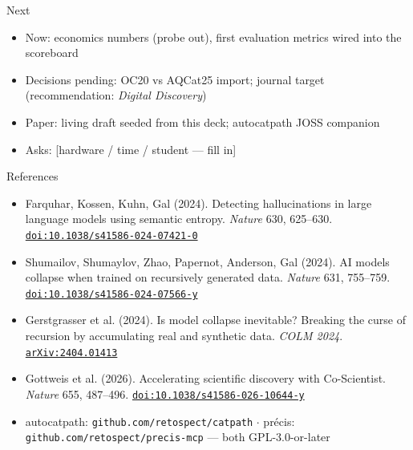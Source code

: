 \documentclass[aspectratio=169,10pt]{beamer}
\newcommand{\doi}[1]{\href{https://doi.org/#1}{\texttt{doi:#1}}}
\gdef\SlideCite{}
\newcommand{\citefield}[1]{\gdef\SlideCite{#1}}
\begin{document}
\begin{frame}{Next}
  \citefield{}
  \begin{itemize}
    \item Now: economics numbers (probe out), first evaluation metrics
          wired into the scoreboard
    \item Decisions pending: OC20 vs AQCat25 import; journal target
          (recommendation: \emph{Digital Discovery})
    \item Paper: living draft seeded from this deck; autocatpath JOSS
          companion
    \item Asks: [hardware / time / student --- fill in]
  \end{itemize}
\end{frame}

\begin{frame}{References}
  \citefield{}
  \scriptsize
  \begin{itemize}
    \item Farquhar, Kossen, Kuhn, Gal (2024). Detecting hallucinations in
          large language models using semantic entropy. \emph{Nature} 630,
          625--630. \doi{10.1038/s41586-024-07421-0}
    \item Shumailov, Shumaylov, Zhao, Papernot, Anderson, Gal (2024).
          AI models collapse when trained on recursively generated data.
          \emph{Nature} 631, 755--759. \doi{10.1038/s41586-024-07566-y}
    \item Gerstgrasser et al. (2024). Is model collapse inevitable?
          Breaking the curse of recursion by accumulating real and
          synthetic data. \emph{COLM 2024}.
          \href{https://arxiv.org/abs/2404.01413}{\texttt{arXiv:2404.01413}}
    \item Gottweis et al. (2026). Accelerating scientific discovery with
          Co-Scientist. \emph{Nature} 655, 487--496.
          \doi{10.1038/s41586-026-10644-y}
    \item autocatpath: \texttt{github.com/retospect/catpath} \(\cdot\)
          précis: \texttt{github.com/retospect/precis-mcp} ---
          both GPL-3.0-or-later
  \end{itemize}
\end{frame}
\end{document}
